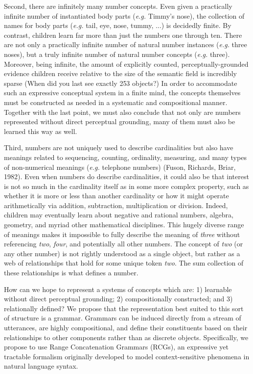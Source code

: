\documentclass[10pt,letterpaper]{article}
\begin{document}
Second, there are infinitely many number concepts. Even given a
practically infinite number of instantiated body parts ({\it e.g.}
Timmy's nose), the collection of names for body parts ({\it e.g.}
tail, eye, nose, tummy, ...) is decidedly finite. By contrast,
children learn far more than just the numbers one through ten. There
are not only a practically infinite number of natural number instances
({\it e.g.} three noses), but a truly infinite number of natural
number concepts ({\it e.g.} three). Moreover, being infinite, the
amount of explicitly counted, perceptually-grounded evidence children
receive relative to the size of the semantic field is incredibly
sparse (When did you last see exactly 253 objects?) In order to
accommodate such an expressive conceptual system in a finite mind, the
concepts themselves must be constructed as needed in a systematic and
compositional manner. Together with the last point, we must also
conclude that not only are numbers represented without direct
perceptual grounding, many of them must also be learned this way as
well.

Third, numbers are not uniquely used to describe cardinalities but
also have meanings related to sequencing, counting, ordinality,
measuring, and many types of non-numerical meanings ({\it e.g.}
telephone numbers) (Fuson, Richards, Briar, 1982). Even when numbers
do describe cardinalities, it could also be that interest is not so
much in the cardinality itself as in some more complex property, such
as whether it is more or less than another cardinality or how it might
operate arithmetically via addition, subtraction, multiplication or
division. Indeed, children may eventually learn about negative and
rational numbers, algebra, geometry, and myriad other mathematical
disciplines. This hugely diverse range of meanings makes it impossible
to fully describe the meaning of \emph{three} without referencing
\emph{two}, \emph{four}, and potentially all other numbers. The
concept of \emph{two} (or any other number) is not rightly understood
as a single object, but rather as a web of relationships that hold for
some unique token \emph{two}. The sum collection of these
relationships is what defines a number.

How can we hope to represent a systems of concepts which are: 1)
learnable without direct perceptual grounding; 2) compositionally
constructed; and 3) relationally defined? We propose that the
representation best suited to this sort of structure is a
grammar. Grammars can be induced directly from a stream of utterances,
are highly compositional, and define their constituents based on their
relationships to other components rather than as discrete
objects. Specifically, we propose to use Range Concatenation Grammars (RCGs),
an expressive yet tractable formalism originally developed to model
context-sensitive phenomena in natural language syntax.
\end{document}
